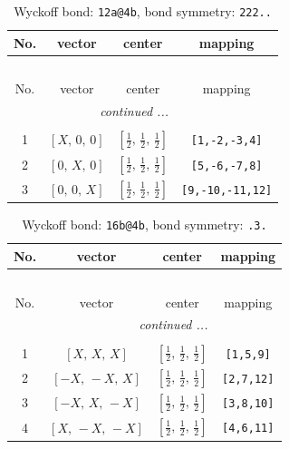 \documentclass[fleqn,8pt]{jsarticle}
\begin{document}
\begin{longtable}{cccc}
\caption{Wyckoff bond: {\tt 12a@4b}, bond symmetry: {\tt 222..}}
 \\
 \hline \hline
No. & vector & center & mapping \\ \hline \endfirsthead

\multicolumn{3}{l}{\tablename\ \thetable{}} \\
 \hline \hline
No. & vector & center & mapping \\ \hline \endhead

 \hline \hline
\multicolumn{3}{r}{\footnotesize\it continued ...} \\ \endfoot

 \hline \hline
\multicolumn{3}{r}{} \\ \endlastfoot

1 & $\left[ X,\, 0,\, 0 \right]$ & $\left[ \frac{1}{2},\, \frac{1}{2},\, \frac{1}{2} \right]$ & {\tt [1,-2,-3,4]} \\ \hline
2 & $\left[ 0,\, X,\, 0 \right]$ & $\left[ \frac{1}{2},\, \frac{1}{2},\, \frac{1}{2} \right]$ & {\tt [5,-6,-7,8]} \\ \hline
3 & $\left[ 0,\, 0,\, X \right]$ & $\left[ \frac{1}{2},\, \frac{1}{2},\, \frac{1}{2} \right]$ & {\tt [9,-10,-11,12]} \\
\end{longtable}
\renewcommand{\arraystretch}{1.2}
\begin{longtable}{cccc}
\caption{Wyckoff bond: {\tt 16b@4b}, bond symmetry: {\tt .3.}}
 \\
 \hline \hline
No. & vector & center & mapping \\ \hline \endfirsthead

\multicolumn{3}{l}{\tablename\ \thetable{}} \\
 \hline \hline
No. & vector & center & mapping \\ \hline \endhead

 \hline \hline
\multicolumn{3}{r}{\footnotesize\it continued ...} \\ \endfoot

 \hline \hline
\multicolumn{3}{r}{} \\ \endlastfoot

1 & $\left[ X,\, X,\, X \right]$ & $\left[ \frac{1}{2},\, \frac{1}{2},\, \frac{1}{2} \right]$ & {\tt [1,5,9]} \\ \hline
2 & $\left[ - X,\, - X,\, X \right]$ & $\left[ \frac{1}{2},\, \frac{1}{2},\, \frac{1}{2} \right]$ & {\tt [2,7,12]} \\ \hline
3 & $\left[ - X,\, X,\, - X \right]$ & $\left[ \frac{1}{2},\, \frac{1}{2},\, \frac{1}{2} \right]$ & {\tt [3,8,10]} \\ \hline
4 & $\left[ X,\, - X,\, - X \right]$ & $\left[ \frac{1}{2},\, \frac{1}{2},\, \frac{1}{2} \right]$ & {\tt [4,6,11]} \\
\end{longtable}
\end{document}
